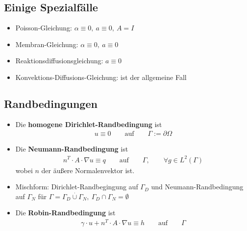 \subsection*{Einige Spezialfälle}
\begin{itemize}
	\item Poisson-Gleichung: $\alpha\equiv 0,~a\equiv0,~A=I$
	\item Membran-Gleichung: $\alpha\equiv0,~a\equiv 0$
	\item Reaktionsdiffusionsgleichung: $a\equiv 0$
	\item Konvektions-Diffusions-Gleichung: ist der allgemeine Fall
\end{itemize}

\subsection*{Randbedingungen}
\begin{itemize}
	\item Die \textbf{homogene Dirichlet-Randbedingung} ist
	\begin{align*}
		u\equiv0\qquad\text{auf}\qquad\Gamma:=\partial\Omega
	\end{align*}
	\item Die \textbf{Neumann-Randbedingung} ist
	\begin{align*}
		n^T\cdot A\cdot\nabla u\equiv q\qquad\text{auf}\qquad\Gamma,\qquad\forall g\in L^2(\Gamma)
	\end{align*}
	wobei $n$ der äußere Normalenvektor ist.
	\item Mischform: Dirichlet-Randbegingung auf $\Gamma_D$ und Neumann-Randbedingung auf $\Gamma_N$ für
	$\Gamma=\Gamma_D\stackrel{\cdot}{\cup}\Gamma_N,~\Gamma_D\cap\Gamma_N=\emptyset$
	\item Die \textbf{Robin-Randbedingung} ist
	\begin{align*}
		\gamma\cdot u+n^T\cdot A\cdot\nabla u\equiv h\qquad\text{auf}\qquad\Gamma
	\end{align*}
\end{itemize}

